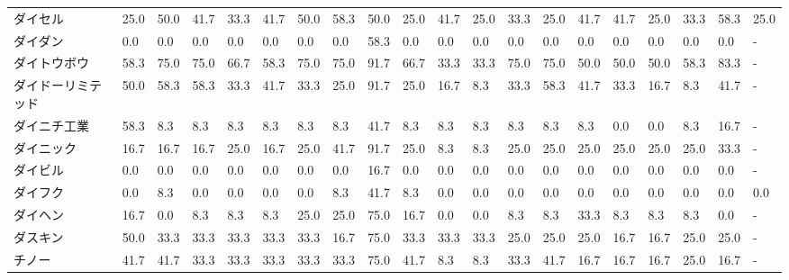 \documentclass[a4paper，11pt]{jsarticle}
\begin{document}
\begin{longtable}[c]{lp{3mm}p{3mm}p{3mm}p{3mm}p{3mm}p{3mm}p{3mm}p{3mm}p{3mm}p{3mm}p{3mm}p{3mm}p{3mm}p{3mm}p{3mm}p{3mm}p{3mm}p{3mm}p{3mm}}
ダイセル            &   25.0 &   50.0 &      41.7 &      33.3 &       41.7 &   50.0 &   58.3 &   50.0 &    25.0 &    41.7 &   25.0 &  33.3 &   25.0 &    41.7 &    41.7 &  25.0 &  33.3 &  58.3 &  25.0 \\
ダイダン            &    0.0 &    0.0 &       0.0 &       0.0 &        0.0 &    0.0 &    0.0 &   58.3 &     0.0 &     0.0 &    0.0 &   0.0 &    0.0 &     0.0 &     0.0 &   0.0 &   0.0 &   0.0 &     - \\
ダイトウボウ          &   58.3 &   75.0 &      75.0 &      66.7 &       58.3 &   75.0 &   75.0 &   91.7 &    66.7 &    33.3 &   33.3 &  75.0 &   75.0 &    50.0 &    50.0 &  50.0 &  58.3 &  83.3 &     - \\
ダイドーリミテッド       &   50.0 &   58.3 &      58.3 &      33.3 &       41.7 &   33.3 &   25.0 &   91.7 &    25.0 &    16.7 &    8.3 &  33.3 &   58.3 &    41.7 &    33.3 &  16.7 &   8.3 &  41.7 &     - \\
ダイニチ工業          &   58.3 &    8.3 &       8.3 &       8.3 &        8.3 &    8.3 &    8.3 &   41.7 &     8.3 &     8.3 &    8.3 &   8.3 &    8.3 &     8.3 &     0.0 &   0.0 &   8.3 &  16.7 &     - \\
ダイニック           &   16.7 &   16.7 &      16.7 &      25.0 &       16.7 &   25.0 &   41.7 &   91.7 &    25.0 &     8.3 &    8.3 &  25.0 &   25.0 &    25.0 &    25.0 &  25.0 &  25.0 &  33.3 &     - \\
ダイビル            &    0.0 &    0.0 &       0.0 &       0.0 &        0.0 &    0.0 &    0.0 &   16.7 &     0.0 &     0.0 &    0.0 &   0.0 &    0.0 &     0.0 &     0.0 &   0.0 &   0.0 &   0.0 &     - \\
ダイフク            &    0.0 &    8.3 &       0.0 &       0.0 &        0.0 &    0.0 &    8.3 &   41.7 &     8.3 &     0.0 &    0.0 &   0.0 &    0.0 &     0.0 &     0.0 &   0.0 &   0.0 &   0.0 &   0.0 \\
ダイヘン            &   16.7 &    0.0 &       8.3 &       8.3 &        8.3 &   25.0 &   25.0 &   75.0 &    16.7 &     0.0 &    0.0 &   8.3 &    8.3 &    33.3 &     8.3 &   8.3 &   8.3 &   0.0 &     - \\
ダスキン            &   50.0 &   33.3 &      33.3 &      33.3 &       33.3 &   33.3 &   16.7 &   75.0 &    33.3 &    33.3 &   33.3 &  25.0 &   25.0 &    25.0 &    16.7 &  16.7 &  25.0 &  25.0 &     - \\
チノー             &   41.7 &   41.7 &      33.3 &      33.3 &       33.3 &   33.3 &   33.3 &   75.0 &    41.7 &     8.3 &    8.3 &  33.3 &   41.7 &    16.7 &    16.7 &  16.7 &  25.0 &  16.7 &     - \\

\end{longtable}
\end{document}
